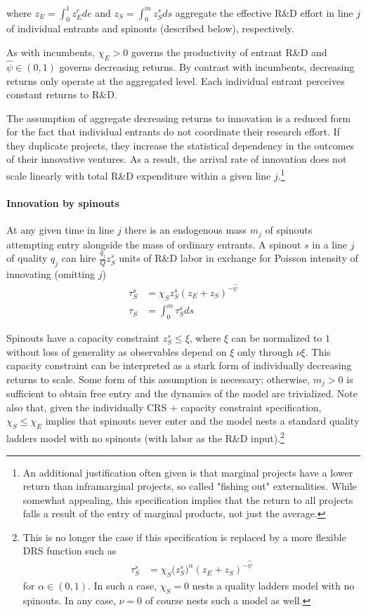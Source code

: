\documentclass[11pt,english]{article}
\theoremstyle{remark}
\begin{document}
where $z_E = \int_0^1 z_E^e de$ and $z_S = \int_0^{m} z_S^s ds$ aggregate the effective R\&D effort in line $j$ of individual entrants and spinouts (described below), respectively. 

As with incumbents, $\chi_E > 0$ governs the productivity of entrant R\&D and $\hat{\psi} \in (0,1)$ governs decreasing returns. By contrast with incumbents, decreasing returns only operate at the aggregated level. Each individual entrant perceives constant returns to R\&D. 

The assumption of aggregate decreasing returns to innovation is a reduced form for the fact that individual entrants do not coordinate their research effort. If they duplicate projects, they increase the statistical dependency in the outcomes of their innovative ventures. As a result, the arrival rate of innovation does not scale linearly with total R\&D expenditure within a given line $j$.\footnote{An additional justification often given is that marginal projects have a lower return than inframarginal projects, so called "fishing out" externalities. While somewhat appealing, this specification implies that the return to all projects falls a result of the entry of marginal products, not just the average.}

\paragraph{Innovation by spinouts}

At any given time in line $j$ there is an endogenous mass $m_j$ of spinouts attempting entry alongside the mass of ordinary entrants. A spinout $s$ in a line $j$ of quality $q_j$ can hire $ \frac{q_j}{Q} z_S^s$ units of R\&D labor in exchange for Poisson intensity of innovating (omitting $j$)
\begin{align}
\tau_S^s &= \chi_S z_S^s (z_E+ z_S)^{-\hat{\psi}}\label{spinout_entry_rate_eq} \\
\tau_S &= \int_0^m \tau_S^s ds \nonumber
\end{align}

Spinouts have a capacity constraint $z_S^s \le \xi$, where $\xi$ can be normalized to $1$ without loss of generality as observables depend on $\xi$ only through $\nu \xi$. This capacity constraint can be interpreted as a stark form of individually decreasing returns to scale. Some form of this assumption is necessary; otherwise, $m_j > 0$ is sufficient to obtain free entry and the dynamics of the model are trivialized. Note also that, given the individually CRS + capacity constraint specification, $\chi_S \le \chi_E$ implies that spinouts never enter and the model nests a standard quality ladders model with no spinouts (with labor as the R\&D input).\footnote{This is no longer the case if this specification is replaced by a more flexible DRS function such as 
	\begin{align}
	\tau_S^s &= \chi_S \Big(z_S^s\Big)^{\alpha} (z_E+ z_S)^{-\hat{\psi}} \nonumber
	\end{align}
	for $\alpha \in (0,1)$. In such a case, $\chi_S = 0$ nests a quality ladders model with no spinouts. In any case, $\nu = 0$ of course nests such a model as well.}
\end{document}
